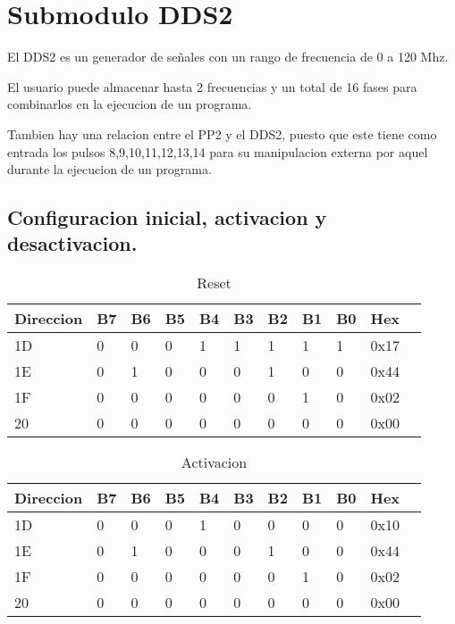 \section{Submodulo DDS2}

El DDS2 es un generador de señales con un rango de frecuencia de 0 a 120 Mhz.

El usuario puede almacenar hasta 2 frecuencias y un total de 16 fases para 
combinarlos en la ejecucion de un programa.

Tambien hay una relacion entre el PP2 y el DDS2, puesto que este tiene como entrada
los pulsos 8,9,10,11,12,13,14 para su manipulacion externa por aquel durante
la ejecucion de un programa.

\subsection{Configuracion inicial, activacion y desactivacion.}

\begin{table}[ht]
    \centering
    \begin{tabular}{|l|l|l|l|l|l|l|l|l|l|l|}
    \hline
    Direccion  &B7 & B6 & B5 & B4& B3 & B2& B1 & B0 &Hex\\
    \hline
    1D  &0 & 0 & 0 & 1& 1 & 1& 1 & 1 &0x17\\
    \hline
    1E  &0 & 1 & 0 & 0& 0 & 1& 0 & 0 &0x44\\
    \hline
    1F  &0 & 0 & 0 & 0& 0 & 0& 1 & 0 & 0x02\\
    \hline
    20  &0 & 0 & 0 & 0 & 0 & 0& 0 & 0&0x00 \\
    \hline
    \end{tabular}
    \caption{\label{tab:dds2_config_inicial}Reset}
    \end{table}

    \begin{table}[ht]
    \centering
    \begin{tabular}{|l|l|l|l|l|l|l|l|l|l|l|}
    \hline
    Direccion  &B7 & B6 & B5 & B4& B3 & B2& B1 & B0 &Hex\\
    \hline
    1D  &0 & 0 & 0 & 1& 0 & 0& 0 & 0 &0x10\\
    \hline
    1E  &0 & 1 & 0 & 0& 0 & 1& 0 & 0 &0x44\\
    \hline
    1F  &0 & 0 & 0 & 0& 0 & 0& 1 & 0 & 0x02\\
    \hline
    20  &0 & 0 & 0 & 0 & 0 & 0& 0 & 0&0x00 \\
    \hline
    \end{tabular}
    \caption{\label{tab:dds2_activate}Activacion}
    \end{table}
    

